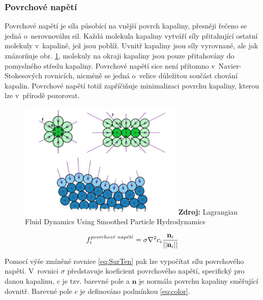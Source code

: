 \subsubsection{Povrchové napětí}
Povrchové napětí je síla působící na vnější povrch kapaliny, přesněji řečeno se jedná o~nerovnováhu sil. Každá molekula kapaliny vytváří síly přitahující ostatní molekuly v~kapalině, jež jsou poblíž. Uvnitř kapaliny jsou síly vyrovnané, ale jak znázorňuje obr. \ref{fig:SurTen}, molekuly na okraji kapaliny jsou pouze přitahovány do pomyslného středu kapaliny. Povrchové napětí sice není přítomno v~Navier-Stokesových rovnicích, nicméně se jedná o~velice důležitou součást chování kapalin. Povrchové napětí totiž zapříčiňuje minimalizaci povrchu kapaliny, kterou lze v~přírodě pozorovat. \cite{KelagerSPH}

\begin{figure}[hbt]
	\centering
	\captionsetup{justification=centering}
	\includegraphics[width=0.7\textwidth]{obrazky-figures/SurfTens.png}
	\textbf{Zdroj: } Lagrangian Fluid Dynamics Using Smoothed Particle Hydrodynamics \cite{KelagerSPH}
	\label{fig:SurTen}
\end{figure}

\begin{equation}
	f_i^{\text{\textit{povrchové napětí}}} = \sigma \nabla^2 c_i \frac{\mathbf{n}_i}{||\mathbf{n}_i||}
	\label{eq:SurfTen}
\end{equation}

Pomocí výše zmíněné rovnice \ref{eq:SurTen} pak lze vypočítat sílu povrchového napětí. V~rovnici $\sigma$ představuje koeficient povrchového napětí, specifický pro danou kapalinu, $c$ je tzv. barevné pole a $\mathbf{n}$ je normála povrchu kapaliny směřující dovnitř. Barevné pole $c$ je definováno podmínkou \ref{eq:color}.

